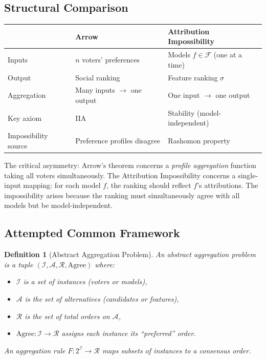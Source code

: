 \documentclass{article}
\newtheorem{definition}[theorem]{Definition}
\begin{document}
\subsection{Structural Comparison}

\begin{center}
\small
\begin{tabular}{@{}lll@{}}
\toprule
& \textbf{Arrow} & \textbf{Attribution Impossibility} \\
\midrule
Inputs & $n$ voters' preferences & Models $f \in \mathcal{F}$ (one at a time) \\
Output & Social ranking & Feature ranking $\sigma$ \\
Aggregation & Many inputs $\to$ one output & One input $\to$ one output \\
Key axiom & IIA & Stability (model-independent) \\
Impossibility source & Preference profiles disagree & Rashomon property \\
\bottomrule
\end{tabular}
\end{center}

The critical asymmetry: Arrow's theorem concerns a \emph{profile aggregation} function taking all voters simultaneously. The Attribution Impossibility concerns a single-input mapping: for each model $f$, the ranking should reflect $f$'s attributions. The impossibility arises because the ranking must simultaneously agree with all models but be model-independent.

\subsection{Attempted Common Framework}

\begin{definition}[Abstract Aggregation Problem]
An \emph{abstract aggregation problem} is a tuple $(\mathcal{I}, \mathcal{A}, \mathcal{R}, \text{Agree})$ where:
\begin{itemize}
    \item $\mathcal{I}$ is a set of \emph{instances} (voters or models),
    \item $\mathcal{A}$ is the set of alternatives (candidates or features),
    \item $\mathcal{R}$ is the set of total orders on $\mathcal{A}$,
    \item $\text{Agree} \colon \mathcal{I} \to \mathcal{R}$ assigns each instance its ``preferred'' order.
\end{itemize}
An \emph{aggregation rule} $F \colon 2^{\mathcal{I}} \to \mathcal{R}$ maps subsets of instances to a consensus order.
\end{definition}
\end{document}
